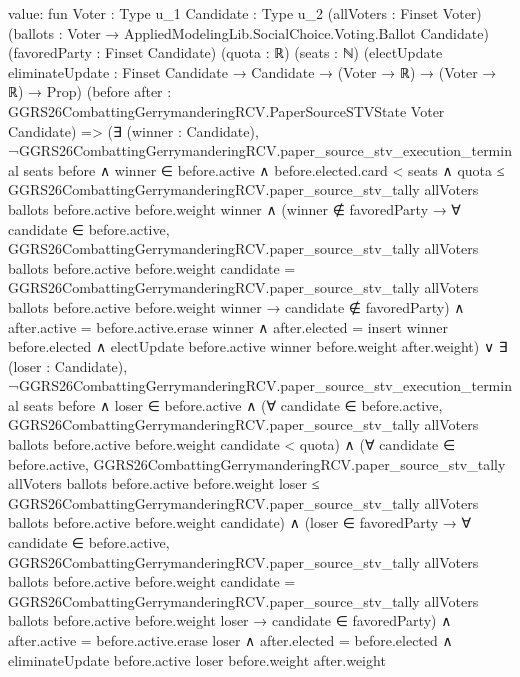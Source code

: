 \documentclass[10pt]{article}
\begin{document}
\begin{ReviewVerbatim}
value:
fun {Voter : Type u_1} {Candidate : Type u_2} (allVoters : Finset Voter)
    (ballots : Voter → AppliedModelingLib.SocialChoice.Voting.Ballot Candidate) (favoredParty : Finset Candidate)
    (quota : ℝ) (seats : ℕ)
    (electUpdate eliminateUpdate : Finset Candidate → Candidate → (Voter → ℝ) → (Voter → ℝ) → Prop)
    (before after : GGRS26CombattingGerrymanderingRCV.PaperSourceSTVState Voter Candidate) =>
  (∃ (winner : Candidate),
      ¬GGRS26CombattingGerrymanderingRCV.paper_source_stv_execution_terminal seats before ∧
        winner ∈ before.active ∧
          before.elected.card < seats ∧
            quota ≤
                GGRS26CombattingGerrymanderingRCV.paper_source_stv_tally allVoters ballots before.active before.weight
                  winner ∧
              (winner ∉ favoredParty →
                  ∀ candidate ∈ before.active,
                    GGRS26CombattingGerrymanderingRCV.paper_source_stv_tally allVoters ballots before.active
                          before.weight candidate =
                        GGRS26CombattingGerrymanderingRCV.paper_source_stv_tally allVoters ballots before.active
                          before.weight winner →
                      candidate ∉ favoredParty) ∧
                after.active = before.active.erase winner ∧
                  after.elected = insert winner before.elected ∧
                    electUpdate before.active winner before.weight after.weight) ∨
    ∃ (loser : Candidate),
      ¬GGRS26CombattingGerrymanderingRCV.paper_source_stv_execution_terminal seats before ∧
        loser ∈ before.active ∧
          (∀ candidate ∈ before.active,
              GGRS26CombattingGerrymanderingRCV.paper_source_stv_tally allVoters ballots before.active before.weight
                  candidate <
                quota) ∧
            (∀ candidate ∈ before.active,
                GGRS26CombattingGerrymanderingRCV.paper_source_stv_tally allVoters ballots before.active before.weight
                    loser ≤
                  GGRS26CombattingGerrymanderingRCV.paper_source_stv_tally allVoters ballots before.active before.weight
                    candidate) ∧
              (loser ∈ favoredParty →
                  ∀ candidate ∈ before.active,
                    GGRS26CombattingGerrymanderingRCV.paper_source_stv_tally allVoters ballots before.active
                          before.weight candidate =
                        GGRS26CombattingGerrymanderingRCV.paper_source_stv_tally allVoters ballots before.active
                          before.weight loser →
                      candidate ∈ favoredParty) ∧
                after.active = before.active.erase loser ∧
                  after.elected = before.elected ∧ eliminateUpdate before.active loser before.weight after.weight
\end{ReviewVerbatim}
\end{document}
